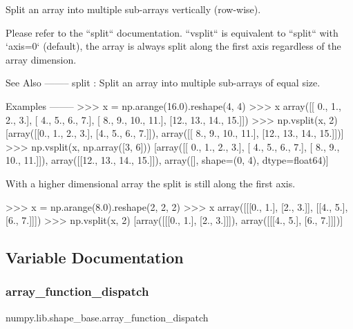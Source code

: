 \begin{DoxyVerb}Split an array into multiple sub-arrays vertically (row-wise).

Please refer to the ``split`` documentation.  ``vsplit`` is equivalent
to ``split`` with `axis=0` (default), the array is always split along the
first axis regardless of the array dimension.

See Also
--------
split : Split an array into multiple sub-arrays of equal size.

Examples
--------
>>> x = np.arange(16.0).reshape(4, 4)
>>> x
array([[ 0.,   1.,   2.,   3.],
       [ 4.,   5.,   6.,   7.],
       [ 8.,   9.,  10.,  11.],
       [12.,  13.,  14.,  15.]])
>>> np.vsplit(x, 2)
[array([[0., 1., 2., 3.],
       [4., 5., 6., 7.]]), array([[ 8.,  9., 10., 11.],
       [12., 13., 14., 15.]])]
>>> np.vsplit(x, np.array([3, 6]))
[array([[ 0.,  1.,  2.,  3.],
       [ 4.,  5.,  6.,  7.],
       [ 8.,  9., 10., 11.]]), array([[12., 13., 14., 15.]]), array([], shape=(0, 4), dtype=float64)]

With a higher dimensional array the split is still along the first axis.

>>> x = np.arange(8.0).reshape(2, 2, 2)
>>> x
array([[[0.,  1.],
        [2.,  3.]],
       [[4.,  5.],
        [6.,  7.]]])
>>> np.vsplit(x, 2)
[array([[[0., 1.],
        [2., 3.]]]), array([[[4., 5.],
        [6., 7.]]])]\end{DoxyVerb}
 

\subsection{Variable Documentation}
\mbox{\label{namespacenumpy_1_1lib_1_1shape__base_ad9a2d886baff0bea9193f85485a753a1}} 
\subsubsection{\texorpdfstring{array\+\_\+function\+\_\+dispatch}{array\_function\_dispatch}}
{\footnotesize\ttfamily numpy.\+lib.\+shape\+\_\+base.\+array\+\_\+function\+\_\+dispatch}

\mbox{\label{namespacenumpy_1_1lib_1_1shape__base_ab703b799ede8879a02e521346f5a25c5}} 
